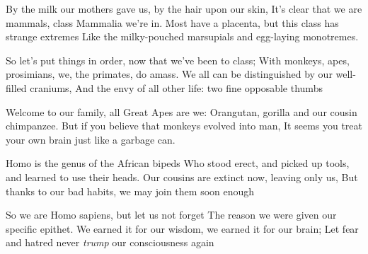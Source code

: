 \documentclass[twoside,16pt,openany,letterpaper]{memoir}%
\begin{document}
By the milk our mothers gave us, by the hair upon our skin,
It’s clear that we are mammals, class Mammalia we’re in.
Most have a placenta, but this class has strange extremes
Like the milky-pouched marsupials and egg-laying monotremes.

So let’s put things in order, now that we’ve been to class;
With monkeys, apes, prosimians, we, the primates, do amass.
We all can be distinguished by our well-filled craniums,
And the envy of all other life: two fine opposable thumbs

Welcome to our family, all Great Apes are we:
Orangutan, gorilla and our cousin chimpanzee.
But if you believe that monkeys evolved into man,
It seems you treat your own brain just like a garbage can.

Homo is the genus of the African bipeds
Who stood erect, and picked up tools, and learned to use their heads.
Our cousins are extinct now, leaving only us,
But thanks to our bad habits, we may join them soon enough

So we are Homo sapiens, but let us not forget
The reason we were given our specific epithet.
We earned it for our wisdom, we earned it for our brain;
Let fear and hatred never \textit{trump} our consciousness again
\end{document}
